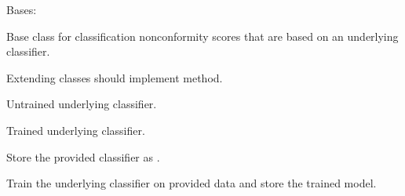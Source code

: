 \documentclass[letterpaper,10pt,english]{sphinxmanual}
\begin{document}

\begin{fulllineitems}
\label{cp.nonconformity:cp.nonconformity.ClassModelNC}
Bases: {\hyperref[cp.nonconformity:cp.nonconformity.ClassNC]{}}

Base class for classification nonconformity scores that are based on an underlying classifier.

Extending classes should implement {\hyperref[cp.nonconformity:cp.nonconformity.ClassNC.nonconformity]{}} method.

\begin{fulllineitems}
\label{cp.nonconformity:cp.nonconformity.ClassModelNC.learner}
Untrained underlying classifier.

\end{fulllineitems}


\begin{fulllineitems}
\label{cp.nonconformity:cp.nonconformity.ClassModelNC.model}
Trained underlying classifier.

\end{fulllineitems}


\begin{fulllineitems}
\label{cp.nonconformity:cp.nonconformity.ClassModelNC.__init__}
Store the provided classifier as {\hyperref[cp.nonconformity:cp.nonconformity.ClassModelNC.learner]{}}.

\end{fulllineitems}


\begin{fulllineitems}
\label{cp.nonconformity:cp.nonconformity.ClassModelNC.fit}
Train the underlying classifier on provided data and store the trained model.

\end{fulllineitems}


\end{fulllineitems}
\end{document}
